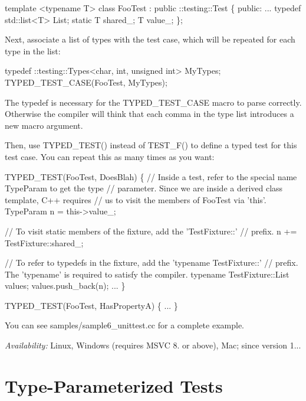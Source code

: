 \begin{DoxyCode}
template <typename T>
class FooTest : public ::testing::Test \{
 public:
  ...
  typedef std::list<T> List;
  static T shared\_;
  T value\_;
\};
\end{DoxyCode}


Next, associate a list of types with the test case, which will be repeated for each type in the list\+:


\begin{DoxyCode}
typedef ::testing::Types<char, int, unsigned int> MyTypes;
TYPED\_TEST\_CASE(FooTest, MyTypes);
\end{DoxyCode}


The {\ttfamily typedef} is necessary for the {\ttfamily T\+Y\+P\+E\+D\+\_\+\+T\+E\+S\+T\+\_\+\+C\+A\+SE} macro to parse correctly. Otherwise the compiler will think that each comma in the type list introduces a new macro argument.

Then, use {\ttfamily T\+Y\+P\+E\+D\+\_\+\+T\+E\+S\+T()} instead of {\ttfamily T\+E\+S\+T\+\_\+\+F()} to define a typed test for this test case. You can repeat this as many times as you want\+:


\begin{DoxyCode}
TYPED\_TEST(FooTest, DoesBlah) \{
  // Inside a test, refer to the special name TypeParam to get the type
  // parameter.  Since we are inside a derived class template, C++ requires
  // us to visit the members of FooTest via 'this'.
  TypeParam n = this->value\_;

  // To visit static members of the fixture, add the 'TestFixture::'
  // prefix.
  n += TestFixture::shared\_;

  // To refer to typedefs in the fixture, add the 'typename TestFixture::'
  // prefix.  The 'typename' is required to satisfy the compiler.
  typename TestFixture::List values;
  values.push\_back(n);
  ...
\}

TYPED\_TEST(FooTest, HasPropertyA) \{ ... \}
\end{DoxyCode}


You can see {\ttfamily samples/sample6\+\_\+unittest.\+cc} for a complete example.

{\itshape Availability\+:} Linux, Windows (requires M\+S\+VC 8. or above), Mac; since version 1...

\section*{Type-\/\+Parameterized Tests}

